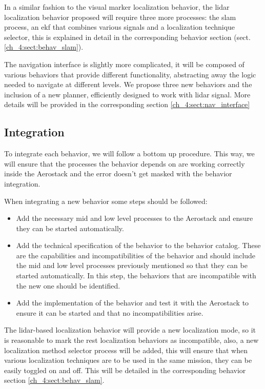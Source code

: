    In a similar fashion to the visual marker localization behavior, the lidar localization behavior proposed will require three more processes: the slam process, an ekf that combines various signals and a localization technique selector, this is explained in detail in the corresponding behavior section (sect. \ref{ch_4:sect:behav_slam}).

    The navigation interface is slightly more complicated, it will be composed of various behaviors that provide different functionality, abstracting away the logic needed to navigate at different levels. We propose three new behaviors and the inclusion of a new planner, efficiently designed to work with lidar signal. More details will be provided in the corresponding section \ref{ch_4:sect:nav_interface}

  \subsection{Integration} \label{ch_4:subsect:integration}

    To integrate each behavior, we will follow a bottom up procedure. This way, we will ensure that the processes the behavior depends on are working correctly inside the Aerostack and the error doesn't get masked with the behavior integration.

    When integrating a new behavior some steps should be followed:
    \begin{itemize}
      \item Add the necessary mid and low level processes to the Aerostack and ensure they can be started automatically.
      \item Add the technical specification of the behavior to the behavior catalog. These are the capabilities and incompatibilities of the behavior and should include the mid and low level processes previously mentioned so that they can be started automatically. In this step, the behaviors that are incompatible with the new one should be identified.
      \item Add the implementation of the behavior and test it with the Aerostack to ensure it can be started and that no incompatibilities arise.
    \end{itemize}

    The lidar-based localization behavior will provide a new localization mode, so it is reasonable to mark the rest localization behaviors as incompatible, also, a new localization method selector process will be added, this will ensure that when various localization techniques are to be used in the same mission, they can be easily toggled on and off. This will be detailed in the corresponding behavior section \ref{ch_4:sect:behav_slam}.

